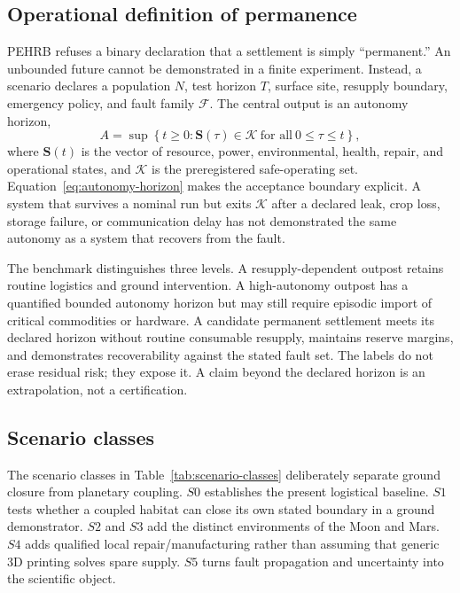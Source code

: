 \documentclass[10pt,conference]{IEEEtran}
\begin{document}
\subsection{Operational definition of permanence}

PEHRB refuses a binary declaration that a settlement is simply ``permanent.'' An unbounded future cannot be demonstrated in a finite experiment. Instead, a scenario declares a population $N$, test horizon $T$, surface site, resupply boundary, emergency policy, and fault family $\mathcal{F}$. The central output is an autonomy horizon,
\begin{equation}
A=\sup\left\{t\geq 0: \mathbf{S}(\tau)\in\mathcal{K}\ \text{for all}\ 0\leq\tau\leq t\right\},
\label{eq:autonomy-horizon}
\end{equation}
where $\mathbf{S}(t)$ is the vector of resource, power, environmental, health, repair, and operational states, and $\mathcal{K}$ is the preregistered safe-operating set. Equation~\eqref{eq:autonomy-horizon} makes the acceptance boundary explicit. A system that survives a nominal run but exits $\mathcal{K}$ after a declared leak, crop loss, storage failure, or communication delay has not demonstrated the same autonomy as a system that recovers from the fault.

The benchmark distinguishes three levels. A resupply-dependent outpost retains routine logistics and ground intervention. A high-autonomy outpost has a quantified bounded autonomy horizon but may still require episodic import of critical commodities or hardware. A candidate permanent settlement meets its declared horizon without routine consumable resupply, maintains reserve margins, and demonstrates recoverability against the stated fault set. The labels do not erase residual risk; they expose it. A claim beyond the declared horizon is an extrapolation, not a certification.

\subsection{Scenario classes}

The scenario classes in Table~\ref{tab:scenario-classes} deliberately separate ground closure from planetary coupling. $S0$ establishes the present logistical baseline. $S1$ tests whether a coupled habitat can close its own stated boundary in a ground demonstrator. $S2$ and $S3$ add the distinct environments of the Moon and Mars. $S4$ adds qualified local repair/manufacturing rather than assuming that generic 3D printing solves spare supply. $S5$ turns fault propagation and uncertainty into the scientific object.
\end{document}
